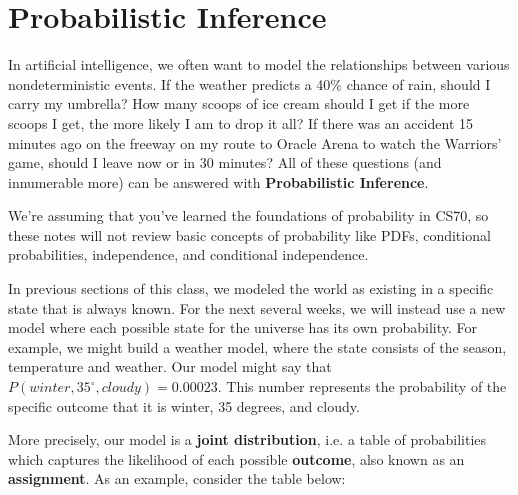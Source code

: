 \documentclass[11pt,fleqn]{article}
\def\title{Note \the\lecturenumber}
\begin{document}
\maketitle


\iffalse
\documentclass[11pt,fleqn]{article}
\usepackage{latexsym,epsf,amsmath,amsfonts,graphicx,url}

\title{Note 6}

\newcommand{\F}{\mathbb{F}}
\newcommand{\Z}{\mathbb{Z}}
\newcommand{\Q}{\mathbb{Q}}
\newcommand{\R}{\mathbb{R}}
\newcommand{\C}{\mathbb{C}}

\begin{document}

\maketitle
\fi

\section*{Probabilistic Inference}

In artificial intelligence, we often want to model the relationships between various nondeterministic events. If the weather predicts a 40\% chance of rain, should I carry my umbrella? How many scoops of ice cream should I get if the more scoops I get, the more likely I am to drop it all? If there was an accident 15 minutes ago on the freeway on my route to Oracle Arena to watch the Warriors' game, should I leave now or in 30 minutes? All of these questions (and innumerable more) can be answered with \textbf{Probabilistic Inference}.

We're assuming that you've learned the foundations of probability in CS70, so these notes will not review basic concepts of probability like PDFs, conditional probabilities, independence, and conditional independence.

In previous sections of this class, we modeled the world as existing in a specific state that is always known. For the next several weeks, we will instead use a new model where each possible state for the universe has its own probability. For example, we might build a weather model, where the state consists of the season, temperature and weather. Our model might say that $P(winter, 35^\circ, cloudy) = 0.00023$. This number represents the probability of the specific outcome that it is winter, 35 degrees, and cloudy.

More precisely, our model is a \textbf{joint distribution}, i.e. a table of probabilities which captures the likelihood of each possible \textbf{outcome}, also known as an \textbf{assignment}. As an example, consider the table below:



\end{document}
\end{document}
